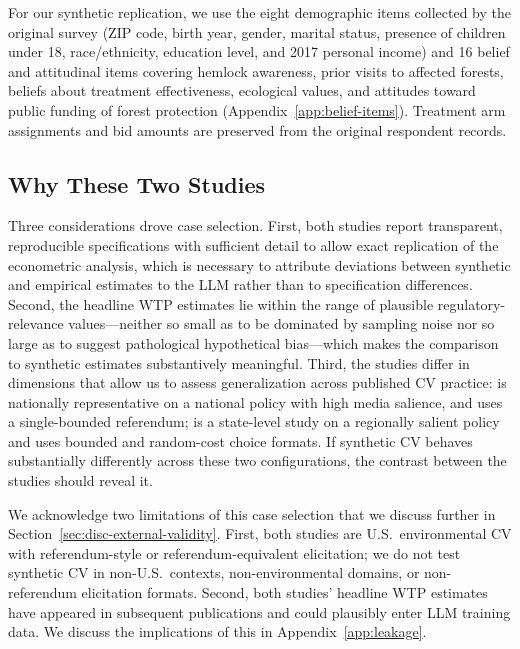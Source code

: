 \documentclass[12pt]{article}
\begin{document}
For our synthetic replication, we use the eight demographic items
collected by the original survey (ZIP code, birth year, gender, marital
status, presence of children under 18, race/ethnicity, education level,
and 2017 personal income) and 16 belief and attitudinal items
covering hemlock awareness, prior visits to affected forests, beliefs
about treatment effectiveness, ecological values, and attitudes toward
public funding of forest protection (Appendix~\ref{app:belief-items}).
Treatment arm assignments and bid amounts are preserved from the original
respondent records.

\subsection{Why These Two Studies}\label{sec:data-why}

Three considerations drove case selection. First, both studies report
transparent, reproducible specifications with sufficient detail to allow
exact replication of the econometric analysis, which is necessary to
attribute deviations between synthetic and empirical estimates to the LLM
rather than to specification differences. Second, the headline WTP
estimates lie within the range of plausible regulatory-relevance
values---neither so small as to be dominated by sampling noise nor so
large as to suggest pathological hypothetical bias---which makes the
comparison to synthetic estimates substantively meaningful. Third, the
studies differ in dimensions that allow us to assess generalization
across published CV practice: \textcite{Aldy2012} is nationally
representative on a national policy with high media salience, and uses a
single-bounded referendum; \textcite{Giguere2020} is a state-level study
on a regionally salient policy and uses bounded and random-cost choice
formats. If synthetic CV behaves substantially differently across these
two configurations, the contrast between the studies should reveal it.

We acknowledge two limitations of this case selection that we discuss
further in Section~\ref{sec:disc-external-validity}. First, both studies
are U.S.\ environmental CV with referendum-style or referendum-equivalent
elicitation; we do not test synthetic CV in non-U.S.\ contexts,
non-environmental domains, or non-referendum elicitation formats. Second,
both studies' headline WTP estimates have appeared in subsequent
publications and could plausibly enter LLM training data. We discuss the
implications of this in Appendix~\ref{app:leakage}.
\end{document}
